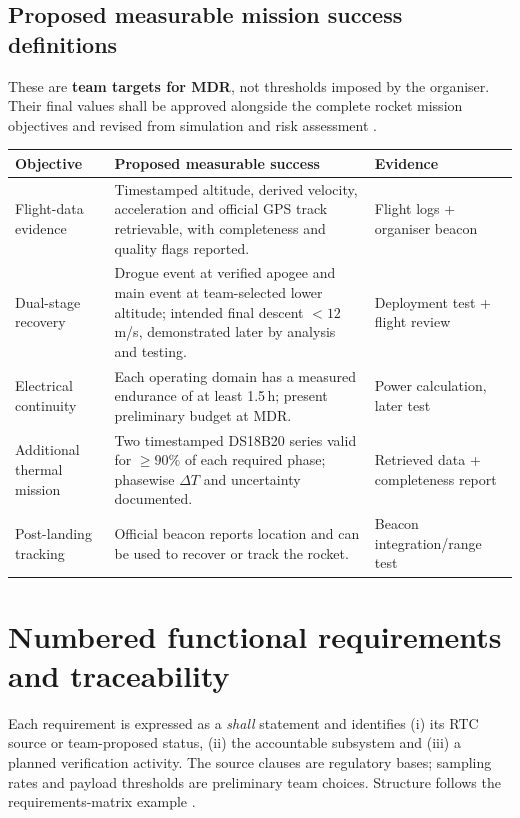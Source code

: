 \subsection*{Proposed measurable mission success definitions}
These are \textbf{team targets for MDR}, not thresholds imposed by the organiser. Their final values shall be approved alongside the complete rocket mission objectives and revised from simulation and risk assessment \cite{rtc2027app01,rtc2027app07}.
\small
\begin{tabularx}{\linewidth}{@{}L{32mm}Y L{37mm}@{}}
\toprule{}\textbf{Objective}&\textbf{Proposed measurable success}&\textbf{Evidence}\\\midrule
Flight-data evidence & Timestamped altitude, derived velocity, acceleration and official GPS track retrievable, with completeness and quality flags reported. & Flight logs + organiser beacon\\
Dual-stage recovery & Drogue event at verified apogee and main event at team-selected lower altitude; intended final descent $<12$\,m/s, demonstrated later by analysis and testing. & Deployment test + flight review\\
Electrical continuity & Each operating domain has a measured endurance of at least 1.5\,h; present preliminary budget at MDR. & Power calculation, later test\\
Additional thermal mission & Two timestamped DS18B20 series valid for $\ge90\%$ of each required phase; phasewise $\Delta T$ and uncertainty documented. & Retrieved data + completeness report\\
Post-landing tracking & Official beacon reports location and can be used to recover or track the rocket. & Beacon integration/range test\\
\bottomrule
\end{tabularx}
\normalsize

\section{Numbered functional requirements and traceability}
\label{sec:reqmatrix}
Each requirement is expressed as a \emph{shall} statement and identifies (i) its RTC source or team-proposed status, (ii) the accountable subsystem and (iii) a planned verification activity. The source clauses are regulatory bases; sampling rates and payload thresholds are preliminary team choices. Structure follows the requirements-matrix example \cite{rtc2027app10}.

